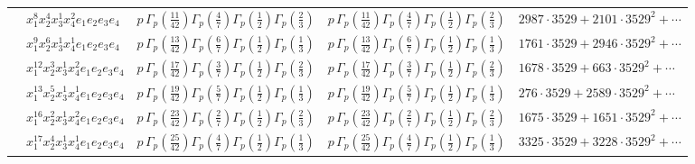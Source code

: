 \documentclass[11pt]{article}
\begin{document}
\begin{table}[ht]
{\begin{tabular}{@{}lllll@{}}
 & $x_{1}^{8} x_{2}^{4} x_{3}^{1} x_{4}^{2}  e_{1} e_{2} e_{3} e_{4}$ & $p \, \Gamma_p \left( \frac{11}{42} \right) \Gamma_p \left( \frac{4}{7} \right) \Gamma_p \left( \frac{1}{2} \right) \Gamma_p \left( \frac{2}{3} \right)$ & $p \, \Gamma_p \left( \frac{11}{42} \right) \Gamma_p \left( \frac{4}{7} \right) \Gamma_p \left( \frac{1}{2} \right) \Gamma_p \left( \frac{2}{3} \right)$ & $2987{\cdot}3529{+}2101{\cdot}3529^{2}{+}\cdots$ \\
 & $x_{1}^{9} x_{2}^{6} x_{3}^{1} x_{4}^{1}  e_{1} e_{2} e_{3} e_{4}$ & $p \, \Gamma_p \left( \frac{13}{42} \right) \Gamma_p \left( \frac{6}{7} \right) \Gamma_p \left( \frac{1}{2} \right) \Gamma_p \left( \frac{1}{3} \right)$ & $p \, \Gamma_p \left( \frac{13}{42} \right) \Gamma_p \left( \frac{6}{7} \right) \Gamma_p \left( \frac{1}{2} \right) \Gamma_p \left( \frac{1}{3} \right)$ & $1761{\cdot}3529{+}2946{\cdot}3529^{2}{+}\cdots$ \\
 & $x_{1}^{12} x_{2}^{3} x_{3}^{1} x_{4}^{2}  e_{1} e_{2} e_{3} e_{4}$ & $p \, \Gamma_p \left( \frac{17}{42} \right) \Gamma_p \left( \frac{3}{7} \right) \Gamma_p \left( \frac{1}{2} \right) \Gamma_p \left( \frac{2}{3} \right)$ & $p \, \Gamma_p \left( \frac{17}{42} \right) \Gamma_p \left( \frac{3}{7} \right) \Gamma_p \left( \frac{1}{2} \right) \Gamma_p \left( \frac{2}{3} \right)$ & $1678{\cdot}3529{+}663{\cdot}3529^{2}{+}\cdots$ \\
 & $x_{1}^{13} x_{2}^{5} x_{3}^{1} x_{4}^{1}  e_{1} e_{2} e_{3} e_{4}$ & $p \, \Gamma_p \left( \frac{19}{42} \right) \Gamma_p \left( \frac{5}{7} \right) \Gamma_p \left( \frac{1}{2} \right) \Gamma_p \left( \frac{1}{3} \right)$ & $p \, \Gamma_p \left( \frac{19}{42} \right) \Gamma_p \left( \frac{5}{7} \right) \Gamma_p \left( \frac{1}{2} \right) \Gamma_p \left( \frac{1}{3} \right)$ & $276{\cdot}3529{+}2589{\cdot}3529^{2}{+}\cdots$ \\
 & $x_{1}^{16} x_{2}^{2} x_{3}^{1} x_{4}^{2}  e_{1} e_{2} e_{3} e_{4}$ & $p \, \Gamma_p \left( \frac{23}{42} \right) \Gamma_p \left( \frac{2}{7} \right) \Gamma_p \left( \frac{1}{2} \right) \Gamma_p \left( \frac{2}{3} \right)$ & $p \, \Gamma_p \left( \frac{23}{42} \right) \Gamma_p \left( \frac{2}{7} \right) \Gamma_p \left( \frac{1}{2} \right) \Gamma_p \left( \frac{2}{3} \right)$ & $1675{\cdot}3529{+}1651{\cdot}3529^{2}{+}\cdots$ \\
 & $x_{1}^{17} x_{2}^{4} x_{3}^{1} x_{4}^{1}  e_{1} e_{2} e_{3} e_{4}$ & $p \, \Gamma_p \left( \frac{25}{42} \right) \Gamma_p \left( \frac{4}{7} \right) \Gamma_p \left( \frac{1}{2} \right) \Gamma_p \left( \frac{1}{3} \right)$ & $p \, \Gamma_p \left( \frac{25}{42} \right) \Gamma_p \left( \frac{4}{7} \right) \Gamma_p \left( \frac{1}{2} \right) \Gamma_p \left( \frac{1}{3} \right)$ & $3325{\cdot}3529{+}3228{\cdot}3529^{2}{+}\cdots$ \\

\end{tabular}}
\end{table}
\end{document}
